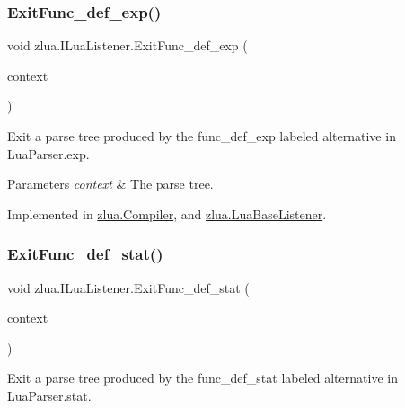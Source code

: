 \subsubsection{\texorpdfstring{Exit\+Func\+\_\+def\+\_\+exp()}{ExitFunc\_def\_exp()}}
{\footnotesize\ttfamily void zlua.\+I\+Lua\+Listener.\+Exit\+Func\+\_\+def\+\_\+exp (\begin{DoxyParamCaption}\item[{\mbox{[}\+Not\+Null\mbox{]} \mbox{\hyperlink{classzlua_1_1_lua_parser_1_1_func__def__exp_context}{Lua\+Parser.\+Func\+\_\+def\+\_\+exp\+Context}}}]{context }\end{DoxyParamCaption})}



Exit a parse tree produced by the {\ttfamily func\+\_\+def\+\_\+exp} labeled alternative in Lua\+Parser.\+exp. 


\begin{DoxyParams}{Parameters}
{\em context} & The parse tree.\\
\hline
\end{DoxyParams}


Implemented in \mbox{\hyperlink{classzlua_1_1_compiler_a52eac177380013cc2c8751c4bee9d1dc}{zlua.\+Compiler}}, and \mbox{\hyperlink{classzlua_1_1_lua_base_listener_a7826a6c13bab904e4525274152d85550}{zlua.\+Lua\+Base\+Listener}}.

\mbox{\label{interfacezlua_1_1_i_lua_listener_a223ff1fef03cefaf9758254c32011257}} 
\subsubsection{\texorpdfstring{Exit\+Func\+\_\+def\+\_\+stat()}{ExitFunc\_def\_stat()}}
{\footnotesize\ttfamily void zlua.\+I\+Lua\+Listener.\+Exit\+Func\+\_\+def\+\_\+stat (\begin{DoxyParamCaption}\item[{\mbox{[}\+Not\+Null\mbox{]} \mbox{\hyperlink{classzlua_1_1_lua_parser_1_1_func__def__stat_context}{Lua\+Parser.\+Func\+\_\+def\+\_\+stat\+Context}}}]{context }\end{DoxyParamCaption})}



Exit a parse tree produced by the {\ttfamily func\+\_\+def\+\_\+stat} labeled alternative in Lua\+Parser.\+stat. 


